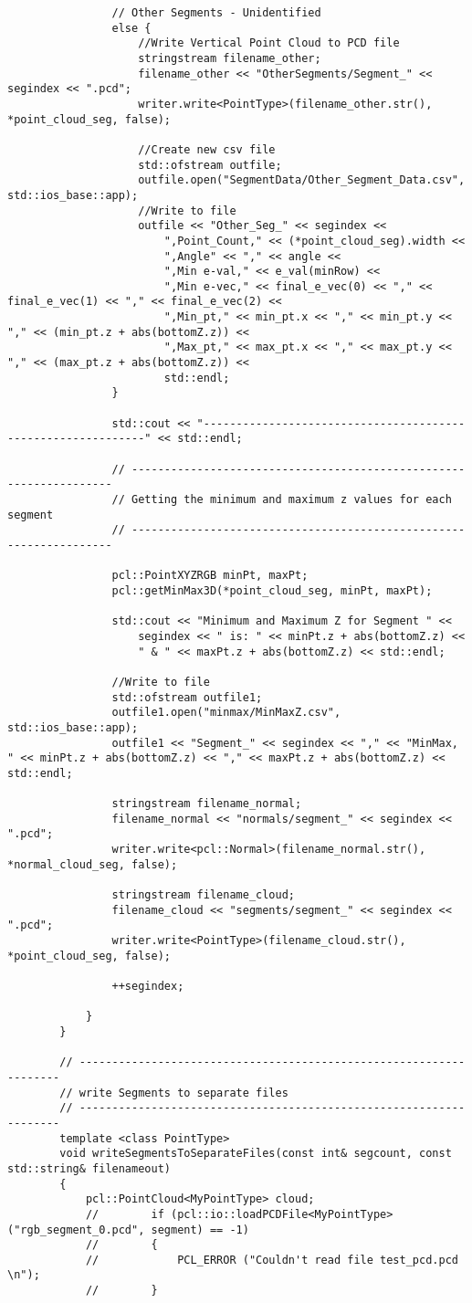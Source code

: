\begin{lstlisting}
				// Other Segments - Unidentified
				else {
					//Write Vertical Point Cloud to PCD file
					stringstream filename_other;
					filename_other << "OtherSegments/Segment_" << segindex << ".pcd";
					writer.write<PointType>(filename_other.str(), *point_cloud_seg, false);

					//Create new csv file
					std::ofstream outfile;
					outfile.open("SegmentData/Other_Segment_Data.csv", std::ios_base::app);
					//Write to file
					outfile << "Other_Seg_" << segindex <<
						",Point_Count," << (*point_cloud_seg).width <<
						",Angle" << "," << angle <<
						",Min e-val," << e_val(minRow) <<
						",Min e-vec," << final_e_vec(0) << "," << final_e_vec(1) << "," << final_e_vec(2) <<
						",Min_pt," << min_pt.x << "," << min_pt.y << "," << (min_pt.z + abs(bottomZ.z)) <<
						",Max_pt," << max_pt.x << "," << max_pt.y << "," << (max_pt.z + abs(bottomZ.z)) <<
						std::endl;
				}

				std::cout << "-------------------------------------------------------------" << std::endl;

				// -------------------------------------------------------------------
				// Getting the minimum and maximum z values for each segment
				// -------------------------------------------------------------------

				pcl::PointXYZRGB minPt, maxPt;
				pcl::getMinMax3D(*point_cloud_seg, minPt, maxPt);

				std::cout << "Minimum and Maximum Z for Segment " <<
					segindex << " is: " << minPt.z + abs(bottomZ.z) <<
					" & " << maxPt.z + abs(bottomZ.z) << std::endl;

				//Write to file
				std::ofstream outfile1;
				outfile1.open("minmax/MinMaxZ.csv", std::ios_base::app);
				outfile1 << "Segment_" << segindex << "," << "MinMax, " << minPt.z + abs(bottomZ.z) << "," << maxPt.z + abs(bottomZ.z) << std::endl;

				stringstream filename_normal;
				filename_normal << "normals/segment_" << segindex << ".pcd";
				writer.write<pcl::Normal>(filename_normal.str(), *normal_cloud_seg, false);

				stringstream filename_cloud;
				filename_cloud << "segments/segment_" << segindex << ".pcd";
				writer.write<PointType>(filename_cloud.str(), *point_cloud_seg, false);

				++segindex;

			}
		}

		// -------------------------------------------------------------------
		// write Segments to separate files
		// -------------------------------------------------------------------
		template <class PointType>
		void writeSegmentsToSeparateFiles(const int& segcount, const std::string& filenameout)
		{
			pcl::PointCloud<MyPointType> cloud;
			//        if (pcl::io::loadPCDFile<MyPointType> ("rgb_segment_0.pcd", segment) == -1)
			//        {
			//            PCL_ERROR ("Couldn't read file test_pcd.pcd \n");
			//        }


\end{lstlisting}

